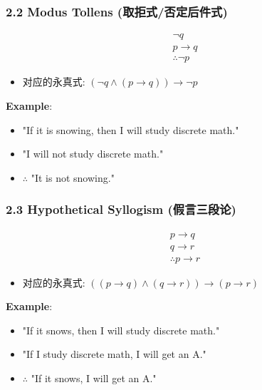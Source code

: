 \documentclass[10pt,a4paper,openany]{ctexbook}
\theoremstyle{definition}
\theoremstyle{remark}
\begin{document}
\vspace{-2pt}

\subsubsection{2.2 Modus Tollens (取拒式/否定后件式)}

\[
\begin{array}{c}
\neg q \\
p \to q \\
\hline
\therefore \neg p
\end{array}
\]

\begin{itemize}
\item 对应的永真式: $(\neg q \land (p \to q)) \to \neg p$

\end{itemize}

\textbf{Example}:
\begin{itemize}
\item "If it is snowing, then I will study discrete math."
\item "I will not study discrete math."
\item $\therefore$ "It is not snowing."

\end{itemize}

\vspace{-2pt}

\subsubsection{2.3 Hypothetical Syllogism (假言三段论)}

\[
\begin{array}{c}
p \to q \\
q \to r \\
\hline
\therefore p \to r
\end{array}
\]

\begin{itemize}
\item 对应的永真式: $((p \to q) \land (q \to r)) \to (p \to r)$

\end{itemize}

\textbf{Example}:
\begin{itemize}
\item "If it snows, then I will study discrete math."
\item "If I study discrete math, I will get an A."
\item $\therefore$ "If it snows, I will get an A."

\end{itemize}
\end{document}
